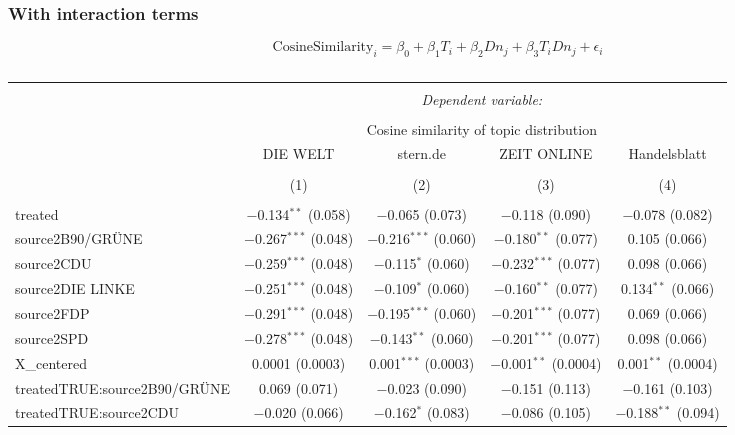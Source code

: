 \documentclass[
]{article}
\begin{document}
\hypertarget{with-interaction-terms}{%
\subsubsection{With interaction terms}\label{with-interaction-terms}}

\[
\text{CosineSimilarity}_{i}=\beta_0+\beta_1T_i+\beta_2Dn_{j}+\beta_3T_iDn_{j}+\epsilon_i
\]

\begin{table}[!htbp] \centering 
  \caption{} 
  \label{} 
\tiny 
\begin{tabular}{@{\extracolsep{5pt}}lcccc} 
\\[-1.8ex]\hline 
\hline \\[-1.8ex] 
 & \multicolumn{4}{c}{\textit{Dependent variable:}} \\ 
\cline{2-5} 
\\[-1.8ex] & \multicolumn{4}{c}{Cosine similarity of topic distribution} \\ 
 & DIE WELT & stern.de & ZEIT ONLINE & Handelsblatt \\ 
\\[-1.8ex] & (1) & (2) & (3) & (4)\\ 
\hline \\[-1.8ex] 
 treated & $-$0.134$^{**}$ (0.058) & $-$0.065 (0.073) & $-$0.118 (0.090) & $-$0.078 (0.082) \\ 
  source2B90/GRÜNE & $-$0.267$^{***}$ (0.048) & $-$0.216$^{***}$ (0.060) & $-$0.180$^{**}$ (0.077) & 0.105 (0.066) \\ 
  source2CDU & $-$0.259$^{***}$ (0.048) & $-$0.115$^{*}$ (0.060) & $-$0.232$^{***}$ (0.077) & 0.098 (0.066) \\ 
  source2DIE LINKE & $-$0.251$^{***}$ (0.048) & $-$0.109$^{*}$ (0.060) & $-$0.160$^{**}$ (0.077) & 0.134$^{**}$ (0.066) \\ 
  source2FDP & $-$0.291$^{***}$ (0.048) & $-$0.195$^{***}$ (0.060) & $-$0.201$^{***}$ (0.077) & 0.069 (0.066) \\ 
  source2SPD & $-$0.278$^{***}$ (0.048) & $-$0.143$^{**}$ (0.060) & $-$0.201$^{***}$ (0.077) & 0.098 (0.066) \\ 
  X\_centered & 0.0001 (0.0003) & 0.001$^{***}$ (0.0003) & $-$0.001$^{**}$ (0.0004) & 0.001$^{**}$ (0.0004) \\ 
  treatedTRUE:source2B90/GRÜNE & 0.069 (0.071) & $-$0.023 (0.090) & $-$0.151 (0.113) & $-$0.161 (0.103) \\ 
  treatedTRUE:source2CDU & $-$0.020 (0.066) & $-$0.162$^{*}$ (0.083) & $-$0.086 (0.105) & $-$0.188$^{**}$ (0.094) \\ 

\end{tabular}
\end{table}
\end{document}

